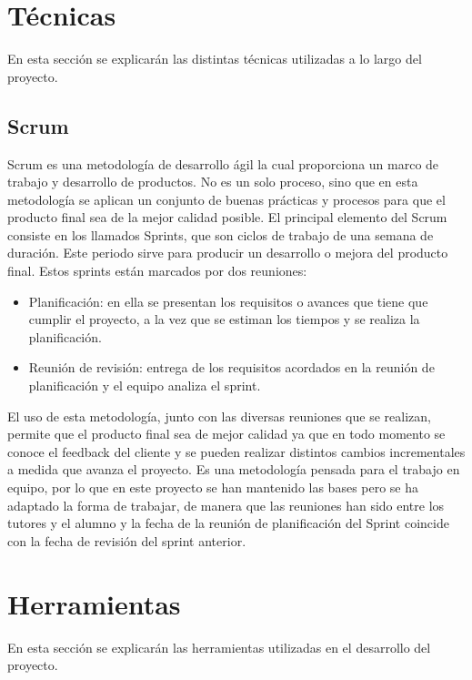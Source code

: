 


\section{Técnicas}
En esta sección se explicarán las distintas técnicas utilizadas a lo largo del proyecto.

\subsection{Scrum}
Scrum es una metodología de desarrollo ágil la cual proporciona un marco de trabajo y desarrollo de productos. No es un solo proceso, sino que en esta metodología se aplican un conjunto de buenas prácticas y procesos para que el producto final sea de la mejor calidad posible.
El principal elemento del Scrum consiste en los llamados Sprints, que son ciclos de trabajo de una semana de duración. Este periodo sirve para producir un desarrollo o mejora del producto final. Estos sprints están marcados por dos reuniones:
\begin{itemize}
	\item Planificación: en ella se presentan los requisitos o avances que tiene que cumplir el proyecto, a la vez que se estiman los tiempos y se realiza la planificación.
	\item Reunión de revisión: entrega de los requisitos acordados en la reunión de planificación y el equipo analiza el sprint.
\end{itemize}
El uso de esta metodología, junto con las diversas reuniones que se realizan, permite que el producto final sea de mejor calidad ya que en todo momento se conoce el feedback del cliente y se pueden realizar distintos cambios incrementales a medida que avanza el proyecto.
Es una metodología pensada para el trabajo en equipo, por lo que en este proyecto se han mantenido las bases pero se ha adaptado la forma de trabajar, de manera que las reuniones han sido entre los tutores y el alumno y la fecha de la reunión de planificación del Sprint coincide con la fecha de revisión del sprint anterior.



\section{Herramientas}\label{herramientas}
En esta sección se explicarán las herramientas utilizadas en el desarrollo del proyecto.

